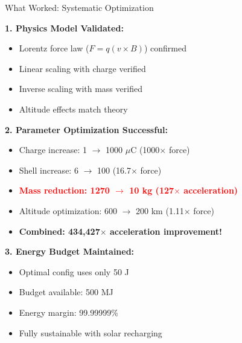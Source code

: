 \documentclass[11pt]{beamer}
\begin{document}
\begin{frame}{What Worked: Systematic Optimization}

\textbf{1. Physics Model Validated:}
\begin{itemize}
\item Lorentz force law ($F = q(v \times B)$) confirmed
\item Linear scaling with charge verified
\item Inverse scaling with mass verified
\item Altitude effects match theory
\end{itemize}

\vspace{0.2cm}

\textbf{2. Parameter Optimization Successful:}
\begin{itemize}
\item Charge increase: 1 $\rightarrow$ 1000 $\mu$C (1000$\times$ force)
\item Shell increase: 6 $\rightarrow$ 100 (16.7$\times$ force)
\item \textcolor{red}{\textbf{Mass reduction: 1270 $\rightarrow$ 10 kg (127$\times$ acceleration)}}
\item Altitude optimization: 600 $\rightarrow$ 200 km (1.11$\times$ force)
\item \textbf{Combined: 434,427$\times$ acceleration improvement!}
\end{itemize}

\vspace{0.2cm}

\textbf{3. Energy Budget Maintained:}
\begin{itemize}
\item Optimal config uses only 50 J
\item Budget available: 500 MJ
\item Energy margin: 99.99999\%
\item Fully sustainable with solar recharging
\end{itemize}

\end{frame}
\end{document}
